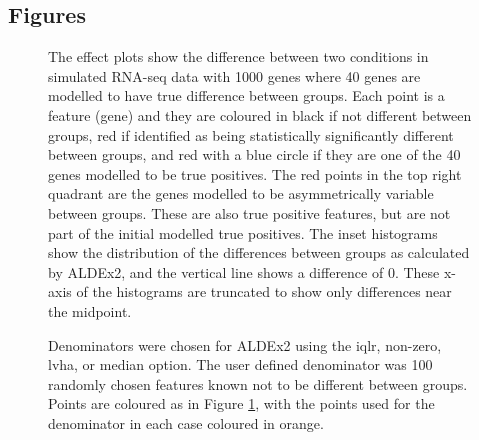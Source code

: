 \documentclass{bmcart}
\def\texttt{[image: ]}
\begin{document}
\begin{backmatter}


\section*{Figures}

\begin{figure}[h!]
\caption{ The effect plots show the difference between two conditions in simulated RNA-seq data with 1000 genes where 40 genes are modelled to have true difference between groups. Each point is a feature (gene) and they are coloured in black if not different between groups, red if identified as being statistically significantly different between groups, and red with a blue circle if they are one of the 40  genes modelled to be  true positives. The red points in the top right quadrant are the genes modelled to be asymmetrically variable between groups. These are also true positive features, but are not part of the initial modelled true positives. The inset histograms show the distribution of the differences between groups as calculated by ALDEx2, and the vertical line shows a difference of 0. These x-axis of the histograms are truncated to show only differences near the midpoint.}
\label{Fig:f1a}
\end{figure}

\begin{figure}[h!]
\caption{ Denominators were chosen for ALDEx2 using the iqlr, non-zero, lvha, or median option. The user defined denominator was 100 randomly chosen features known not to be different between groups. Points are coloured as in Figure \ref{Fig:f1a}, with the points used for the denominator in each case coloured in orange.}
\label{Fig:f2a}
\end{figure}


\end{backmatter}
\end{document}
